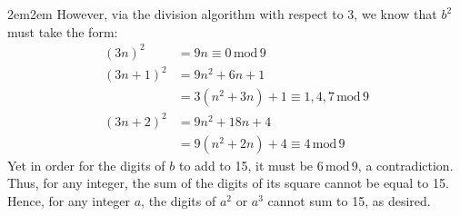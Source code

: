 \documentclass[10pt,oneside]{book}
\newcommand{\gspc}{\vspace{0.13cm}} %
\newcommand{\gline}{\gspc\\} %
\newcommand{\gmod}{\,\text{mod}\,}
\let\endoldproof\endproof
\renewenvironment{proof}[1][\proofname]
  {\vspace{0.2cm}\begin{adjustwidth}{2em}{2em}
   \oldproof[#1]}
  {\endoldproof
\end{adjustwidth}}
\begin{document}
\begin{enumerate}
\begin{proof}
		However, via the division algorithm with respect to 3, we know that $b^2$ must take the form:
		\begin{align*}
			(3n)^2 &= \boxed{9n\equiv 0 \gmod 9}\\
			(3n+1)^2 &= 9n^2 + 6n + 1\\
			&= \boxed{3(n^2+3n) + 1\equiv 1, 4, 7\gmod 9}\\
			(3n+2)^2 &= 9n^2 + 18n + 4\\
			&= \boxed{9(n^2+2n) + 4\equiv 4\gmod 9}
		\end{align*}
		Yet in order for the digits of $b$ to add to 15, it must be $6\gmod 9$, a contradiction. Thus, for any integer, the sum of the digits of its square cannot be equal to 15. \gline
		Hence, for any integer $a$, the digits of $a^2$ or $a^3$ cannot sum to 15, as desired. 
	\end{proof}
\end{enumerate}
\end{document}
